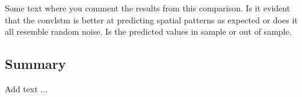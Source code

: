 Some text where you comment the results from this comparison. Is it evident that the \acrshort{convlstm} is better at predicting spatial patterns as expected or does it all resemble random noise. Is the predicted values in sample or out of sample.


\subsection{Summary} \label{sec:summary_num}
Add text ... 

\clearpage
